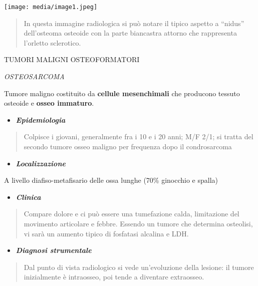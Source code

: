 \documentclass[]{article}
\begin{document}
\texttt{[image: media/image1.jpeg]}

\begin{quote}
In questa immagine radiologica si può notare il tipico aspetto a
``nidus'' dell'osteoma osteoide con la parte biancastra attorno che
rappresenta l'orletto sclerotico.
\end{quote}

TUMORI MALIGNI OSTEOFORMATORI

\emph{OSTEOSARCOMA}

Tumore maligno costituito da \textbf{cellule mesenchimali} che producono
tessuto osteoide e \textbf{osseo immaturo}.

\begin{itemize}
\item
  \textbf{\emph{Epidemiologia}}
\end{itemize}

\begin{quote}
Colpisce i giovani, generalmente fra i 10 e i 20 anni; M/F 2/1; si
tratta del secondo tumore osseo maligno per frequenza dopo il
condrosarcoma
\end{quote}

\begin{itemize}
\item
  \textbf{\emph{Localizzazione}}
\end{itemize}

A livello diafiso-metafisario delle ossa lunghe (70\% ginocchio e
spalla)

\begin{itemize}
\item
  \textbf{\emph{Clinica}}
\end{itemize}

\begin{quote}
Compare dolore e ci può essere una tumefazione calda, limitazione del
movimento articolare e febbre. Essendo un tumore che determina
osteolisi, vi sarà un aumento tipico di fosfatasi alcalina e LDH.
\end{quote}

\begin{itemize}
\item
  \textbf{\emph{Diagnosi strumentale}}
\end{itemize}

\begin{quote}
Dal punto di vista radiologico si vede un'evoluzione della lesione: il
tumore inizialmente è intraosseo, poi tende a diventare extraosseo.
\end{quote}
\end{document}

